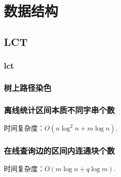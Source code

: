 \documentclass{article}
\begin{document}
\begin{titlepage}

\thispagestyle{empty}
\pagebreak
\pagestyle{plain}
\tableofcontents
\end{titlepage}


% 
% 
% 


\section{数据结构}
\subsection{LCT}
\subsubsection{lct}

\subsubsection{树上路径染色}

\subsubsection{离线统计区间本质不同字串个数}
时间复杂度：$O(n \log^{2}n + m \log n)$.

\subsubsection{在线查询边的区间内连通块个数}
时间复杂度：$O(m \log n + q \log m)$.

\end{document}
